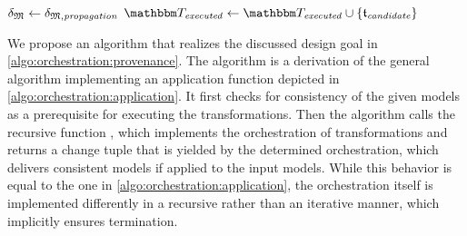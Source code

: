 \begin{algorithm}
\begin{algorithmic}[1]
            \EndIf
            \State $\mathfrak{\delta}_{\mathfrak{M}} \gets \mathfrak{\delta}_{\mathfrak{M},\mathit{propagation}}$
            \State $\provalgexecuted \gets \provalgexecuted \cup \setted{\provalgcandidate}$ \label{algo:orchestration:provenance:line:executed_update}
        \EndFor
        \State {}
    \EndProcedure
    \end{algorithmic}
	
\end{algorithm}

We propose an algorithm that realizes the discussed design goal in \autoref{algo:orchestration:provenance}.
The algorithm is a derivation of the general algorithm implementing an application function depicted in \autoref{algo:orchestration:application}.
It first checks for consistency of the given models as a prerequisite for executing the transformations.
Then the algorithm calls the recursive function , which implements the orchestration of transformations and returns a change tuple that is yielded by the determined orchestration, which delivers consistent models if applied to the input models.
While this behavior is equal to the one in \autoref{algo:orchestration:application}, the orchestration itself is implemented differently in a recursive rather than an iterative manner, which implicitly ensures termination.

